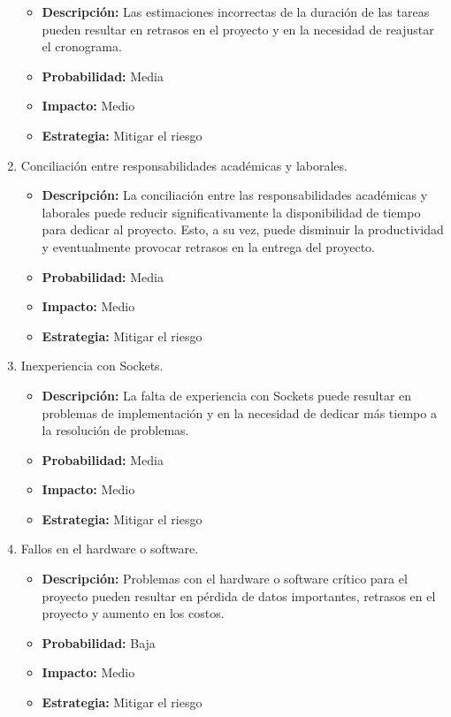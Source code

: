 \begin{enumerate}
\begin{itemize}
        \item \textbf{Descripción:} Las estimaciones incorrectas de la duración de las tareas pueden resultar en retrasos en el proyecto y
         en la necesidad de reajustar el cronograma.
        \item \textbf{Probabilidad:} Media
        \item \textbf{Impacto:} Medio
        \item \textbf{Estrategia:} Mitigar el riesgo
    \end{itemize}
    \item Conciliación entre responsabilidades académicas y laborales.
    \begin{itemize}
        \item \textbf{Descripción:} La conciliación entre las responsabilidades académicas y laborales puede reducir significativamente la disponibilidad de tiempo para dedicar al proyecto. 
        Esto, a su vez, puede disminuir la productividad y eventualmente provocar retrasos en la entrega del proyecto.
        \item \textbf{Probabilidad:} Media
        \item \textbf{Impacto:} Medio
        \item \textbf{Estrategia:} Mitigar el riesgo
    \end{itemize}
    \item Inexperiencia con Sockets.
    \begin{itemize}
        \item \textbf{Descripción:} La falta de experiencia con Sockets puede resultar en problemas de implementación y en la necesidad de dedicar más tiempo a la resolución de problemas.
        \item \textbf{Probabilidad:} Media
        \item \textbf{Impacto:} Medio
        \item \textbf{Estrategia:} Mitigar el riesgo
    \end{itemize}
    \item Fallos en el hardware o software.
    \begin{itemize}
        \item \textbf{Descripción:} Problemas con el hardware o software crítico para el proyecto pueden resultar en pérdida de datos importantes, retrasos en el proyecto y aumento en los costos.
        \item \textbf{Probabilidad:} Baja
        \item \textbf{Impacto:} Medio
        \item \textbf{Estrategia:} Mitigar el riesgo

\end{itemize}
\end{enumerate}
